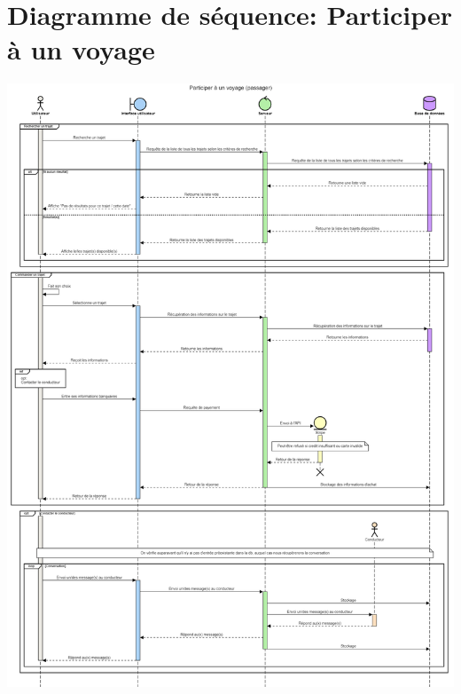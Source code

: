\section{Diagramme de séquence: Participer à un voyage}
\label{Diagramme de séquence: Participer à un voyage}
\begin{center}
\includegraphics[width=\linewidth]{medias/seqVoyage.png}
\end{center}

